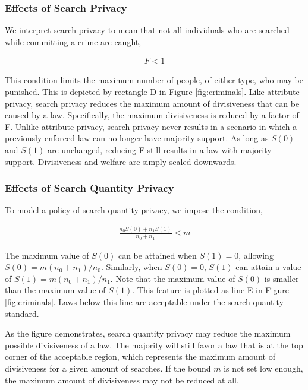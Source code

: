 \subsubsection{Effects of Search Privacy}

We interpret search privacy to mean that not all individuals who are searched while committing a crime are caught, 

\begin{align}
F<1
\end{align}

This condition limits the maximum number of people, of either type, who may be punished.  This is depicted by rectangle D in Figure \ref{fig:criminals}.  Like attribute privacy, search privacy reduces the maximum amount of divisiveness that can be caused by a law.  Specifically, the maximum divisiveness is reduced by a factor of F.  Unlike attribute privacy, search privacy never results in a scenario in which a previously enforced law can no longer have majority support.  As long as $S(0)$ and $S(1)$ are unchanged, reducing F still results in a law with majority support.  Divisiveness and welfare are simply scaled downwards.

\subsubsection{Effects of Search Quantity Privacy}

To model a policy of search quantity privacy, we impose the condition, 

\begin{align}
\frac{n_0 S(0) + n_1 S(1)}{n_0 + n_1}  < m
\end{align}

The maximum value of $S(0)$ can be attained when $S(1) = 0$, allowing $S(0) = m (n_0 + n_1)/n_0$.  Similarly, when $S(0) = 0$, $S(1)$ can attain a value of $S(1) = m (n_0 + n_1)/n_1$.   Note that the maximum value of $S(0)$ is smaller than the maximum value of $S(1)$.  This feature is plotted as line E in Figure \ref{fig:criminals}.  Laws below this line are acceptable under the search quantity standard.  

As the figure demonstrates, search quantity privacy may reduce the maximum possible divisiveness of a law.  The majority will still favor a law that is at the top corner of the acceptable region, which represents the maximum amount of divisiveness for a given amount of searches.  If the bound $m$ is not set low enough, the maximum amount of divisiveness may not be reduced at all.

